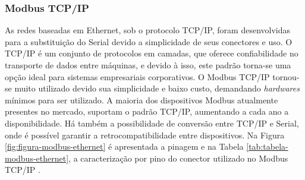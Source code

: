	   \begin{table}[h!]	
        	\centering
        \end{table}
        
    \subsubsection{Modbus TCP/IP}
    \label{sec:modbus-tcp}

        As redes baseadas em Ethernet, sob o protocolo \gls{TCP/IP}, foram desenvolvidas para a substituição do Serial devido a simplicidade de seus conectores e uso. O \gls{TCP/IP} é um conjunto de protocolos em camadas, que oferece confiabilidade no transporte de dados entre máquinas, e devido à isso, este padrão torna-se uma opção ideal para sistemas empresariais corporativos. O Modbus \gls{TCP/IP} tornou-se muito utilizado devido sua simplicidade e baixo custo, demandando \textit{hardwares} mínimos para ser utilizado. A maioria dos dispositivos Modbus atualmente presentes no mercado, suportam o padrão \gls{TCP/IP}, aumentando a cada ano a disponibilidade. Há também a possibilidade de conversão entre TCP/IP e Serial, onde é possível garantir a retrocompatibilidade entre dispositivos. Na Figura \ref{fig:figura-modbus-ethernet} é apresentada a pinagem e na Tabela \ref{tab:tabela-modbus-ethernet}, a caracterização por pino do conector utilizado no Modbus \gls{TCP/IP} \cite{Modbus}.

